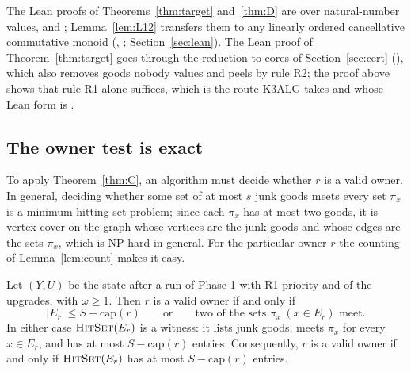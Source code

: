 \documentclass[runningheads,11pt]{llncs}
\newcommand{\capa}{\mathrm{cap}}
\newcommand{\HitSet}{\textup{\textsc{HitSet}}}
\begin{document}
\noindent The Lean proofs of Theorems~\ref{thm:target} and~\ref{thm:D} are over natural-number values,  and ; Lemma~\ref{lem:L12} transfers them to any linearly ordered cancellative commutative monoid (, ; Section~\ref{sec:lean}). The Lean proof of Theorem~\ref{thm:target} goes through the reduction to cores of Section~\ref{sec:cert} (), which also removes goods nobody values and peels by rule R2; the proof above shows that rule R1 alone suffices, which is the route K3ALG takes and whose Lean form is .

\subsection{The owner test is exact}\label{sec:propO}

To apply Theorem~\ref{thm:C}, an algorithm must decide whether $r$ is a valid owner. In general, deciding whether some set of at most $s$ junk goods meets every set $\pi_x$ is a minimum hitting set problem; since each $\pi_x$ has at most two goods, it is vertex cover on the graph whose vertices are the junk goods and whose edges are the sets $\pi_x$, which is NP-hard in general. For the particular owner $r$ the counting of Lemma~\ref{lem:count} makes it easy.

\begin{proposition}\label{prop:O}
Let $(Y,U)$ be the state after a run of Phase 1 with R1 priority and of the upgrades, with $\omega\ge1$. Then $r$ is a valid owner if and only if
\[
  |E_r|\le S-\capa(r)\qquad\text{or}\qquad\text{two of the sets }\pi_x\ (x\in E_r)\text{ meet.}
\]
In either case $\HitSet(E_r)$ is a witness: it lists junk goods, meets $\pi_x$ for every $x\in E_r$, and has at most $S-\capa(r)$ entries. Consequently, $r$ is a valid owner if and only if $\HitSet(E_r)$ has at most $S-\capa(r)$ entries.
\end{proposition}
\end{document}

